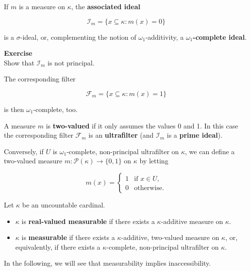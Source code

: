 If $m$ is a measure on $\kappa$, the \textbf{associated ideal}

\begin{equation}
\mathcal{I}_m = \{x\subseteq \kappa \colon m(x) = 0 \}
\end{equation}

is a $\sigma$-ideal, or, complementing the notion of $\omega_1$-additivity, a \textbf{$\omega_1$-complete ideal}.

\begin{framed}
\textbf{Exercise}\\
Show that $\mathcal{I}_m$ is not principal.
\end{framed}

The corresponding filter

\begin{equation}
\mathcal{F}_m = \{x\subseteq \kappa \colon m(x) = 1\}
\end{equation}

is then $\omega_1$-complete, too.

A measure $m$ is \textbf{two-valued} if it only assumes the values 0 and 1. In this case the corresponding filter $\mathcal{F}_m$ is an \textbf{ultrafilter} (and $\mathcal{I}_m$ is a \textbf{prime ideal}).

Conversely, if $U$ is $\omega_1$-complete, non-principal ultrafilter on $\kappa$, we can define a two-valued measure $m: \mathcal{P}(\kappa) \to \{0,1\}$ on $\kappa$ by letting

\begin{equation}
m(x) = 
  \begin{cases}
   1  & \text{if } x \in U, \\
   0   & \text{otherwise}.
\end{cases}
\end{equation}

\begin{definition}\label{def-measurable-cardinal}Let $\kappa$ be an uncountable cardinal.

\begin{itemize}
\item $\kappa$ is \textbf{real-valued measurable} if there exists a $\kappa$-additive measure on $\kappa$.


\item $\kappa$ is \textbf{measurable} if there exists a $\kappa$-additive, two-valued measure on $\kappa$, or, equivalently, if there exists a $\kappa$-complete, non-principal ultrafilter on $\kappa$.
\end{itemize}

\end{definition}In the following, we will see that measurability implies inaccessibility.

